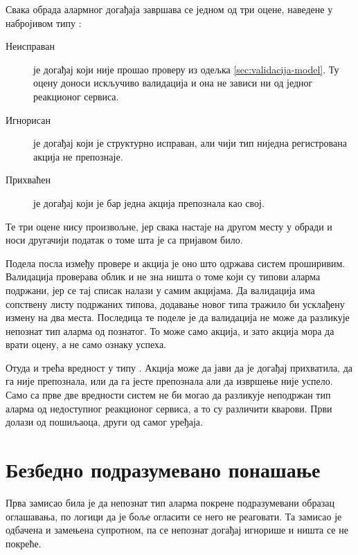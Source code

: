 \documentclass[12pt,oneside]{memoir}
\begin{document}
Свака обрада алармног догађаја завршава се једном од три оцене, наведене у набројивом типу
:

\begin{description}
  \item[Неисправан] је догађај који није прошао проверу из одељка
        \ref{sec:validacija-model}. Ту оцену доноси искључиво валидација и она не зависи ни
        од једног реакционог сервиса.
  \item[Игнорисан] је догађај који је структурно исправан, али чији тип ниједна регистрована
        акција не препознаје.
  \item[Прихваћен] је догађај који је бар једна акција препознала као свој.
\end{description}

Те три оцене нису произвољне, јер свака настаје на другом месту у обради и носи другачији
податак о томе шта је са пријавом било.

Подела посла између провере и акција је оно што одржава систем проширивим. Валидација проверава
облик и не зна ништа о томе који су типови аларма подржани, јер се тај списак налази у самим акцијама. 
Да валидација има сопствену листу подржаних типова, додавање новог типа тражило би
усклађену измену на два места. Последица те поделе је да валидација не може да разликује
непознат тип аларма од познатог. То може само акција, и зато акција мора да врати оцену,
а не само ознаку успеха.

Отуда и трећа вредност у типу . Акција може да јави да је догађај
прихватила, да га није препознала, или да га јесте препознала али да извршење није успело.
Само са прве две вредности систем не би могао да разликује неподржан тип аларма од
недоступног реакционог сервиса, а то су различити кварови. Први долази од пошиљаоца, други
од самог уређаја.

\section{Безбедно подразумевано понашање}
\label{sec:bezbedno-ponasanje}

Прва замисао била је да непознат тип аларма покрене подразумевани образац оглашавања, по
логици да је боље огласити се него не реаговати. Та замисао је одбачена и замењена
супротном, па се непознат догађај игнорише и ништа се не покреће.
\end{document}
